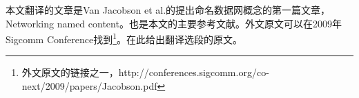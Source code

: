 % 
%
%
% 
%

\par
本文翻译的文章是Van Jacobson et al.的提出命名数据网概念的第一篇文章，Networking named content。也是本文的主要参考文献。外文原文可以在2009年Sigcomm Conference找到\footnote{外文原文的链接之一，http://conferences.sigcomm.org/co-next/2009/papers/Jacobson.pdf}。在此给出翻译选段的原文。
